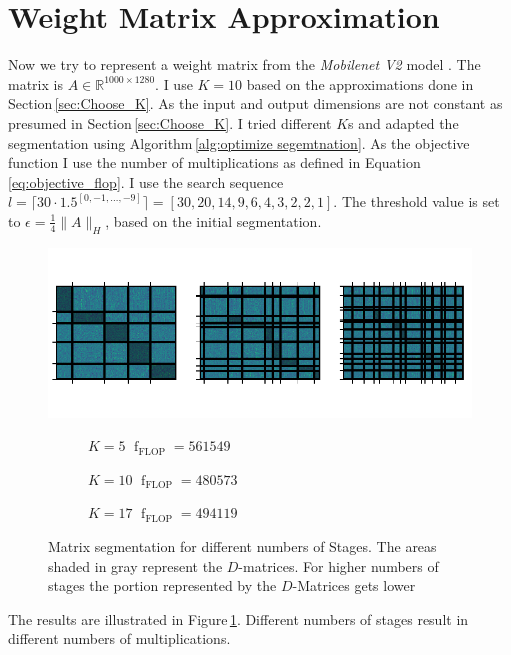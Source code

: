 \documentclass[doctype=mastersthesis,BCOR=15mm,biblatex]{ldvbook}%
\DeclareMathOperator{\f}{f}
\begin{document}
\section{Weight Matrix Approximation}
Now we try to represent a weight matrix from the \emph{Mobilenet V2} model \cite{sandler_mobilenetv2_2019}.
The matrix is $A \in \mathbb{R}^{1000 \times 1280}$.
I use $K = 10$ based on the approximations done in Section\,\ref{sec:Choose_K}.
As the input and output dimensions are not constant as presumed in Section\,\ref{sec:Choose_K}. I tried different $K$s and adapted the segmentation using Algorithm\,\ref{alg:optimize segemtnation}.
As the objective function I use the number of multiplications as defined in Equation\,\ref{eq:objective_flop}.
I use the search sequence $l = \lceil 30 \cdot 1.5^{[0,-1,\dots,-9]} \rceil = [30, 20, 14,  9,  6,  4,  3,  2,  2,  1]$.
The threshold value is set to $\epsilon = \frac{1}{4} \|A\|_H$, based on the initial segmentation.
\begin{figure}[!htb]
	\includegraphics[trim=0.4cm 0.9cm 0 0, clip,width=\textwidth]{Plots/Mobilenet_diff_K.pdf}
	\begin{subfigure}[b]{0.3\textwidth}
		\caption{$K=5$  $\f_{\text{FLOP}}=561549$}
	\end{subfigure}
	\begin{subfigure}[b]{0.34\textwidth}
		\caption{$K=10$  $\f_{\text{FLOP}}=480573$}
	\end{subfigure}
	\begin{subfigure}[b]{0.34\textwidth}
	\caption{$K=17$ $\f_{\text{FLOP}}=494119$}
	\end{subfigure}
	\caption{Matrix segmentation for different numbers of Stages.
	The areas shaded in gray represent the $D$-matrices.
	For higher numbers of stages the portion represented by the $D$-Matrices gets lower}
	\label{fig:Mobilenet_diff_Ks}
\end{figure}
The results are illustrated in Figure\,\ref{fig:Mobilenet_diff_Ks}.
Different numbers of stages result in different numbers of multiplications.
\end{document}
